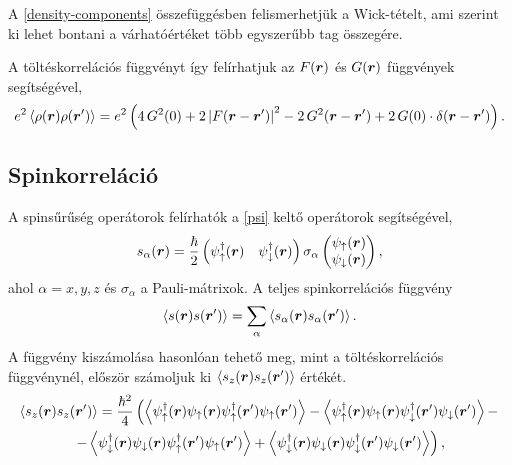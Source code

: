 \documentclass[a4paper,12pt,titlepage]{article}
\newcommand{\RR}{{\vb*{r}}}
\begin{document}
A \eqref{density-components} összefüggésben felismerhetjük a Wick-tételt, ami szerint ki lehet bontani a várhatóértéket több egyszerűbb tag összegére.

A töltéskorrelációs függvényt így felírhatjuk az $F(\RR)$ és $G(\RR)$ függvények segítségével,
\begin{equation}
	e^2 \left< \rho(\RR) \rho(\RR^\prime) \right> = e^2 \left( 4 \, G^2(0) + 2 \left| F(\RR - \RR^\prime) \right|^2 - 2 \, G^2(\RR - \RR^\prime) + 2 \, G(0) \cdot \delta(\RR - \RR^\prime) \right).
\end{equation}


\subsection{Spinkorreláció}

A spinsűrűség operátorok felírhatók a \eqref{psi} keltő operátorok segítségével,
\begin{equation}
	s_\alpha(\RR) = \frac{\hbar}{2} \begin{pmatrix} \psi_\uparrow^\dagger(\RR) & \psi_\downarrow^\dagger(\RR) \end{pmatrix} \sigma_\alpha \begin{pmatrix} \psi_\uparrow(\RR) \\ \psi_\downarrow(\RR) \end{pmatrix},
\end{equation}
ahol $\alpha = x, y, z$ és $\sigma_\alpha$ a Pauli-mátrixok.  A teljes spinkorrelációs függvény
\begin{equation}
	\left< s(\RR) s(\RR^\prime) \right> = \sum_\alpha \left< s_\alpha(\RR) s_\alpha(\RR^\prime) \right>.
\end{equation}
A függvény kiszámolása hasonlóan tehető meg, mint a töltéskorrelációs függvénynél, először számoljuk ki $\left< s_z(\RR) s_z(\RR^\prime) \right>$ értékét.
\begin{multline}
	\left< s_z(\RR) s_z(\RR^\prime) \right> = \frac{\hbar^2}{4} \left( \left< \psi_\uparrow^\dagger(\RR) \psi_\uparrow(\RR) \psi_\uparrow^\dagger(\RR^\prime) \psi_\uparrow(\RR^\prime) \right> - \left< \psi_\uparrow^\dagger(\RR) \psi_\uparrow(\RR) \psi_\downarrow^\dagger(\RR^\prime) \psi_\downarrow(\RR^\prime) \right> -
	\right. \\ \left. -
	\left< \psi_\downarrow^\dagger(\RR) \psi_\downarrow(\RR) \psi_\uparrow^\dagger(\RR^\prime) \psi_\uparrow(\RR^\prime) \right> + \left< \psi_\downarrow^\dagger(\RR) \psi_\downarrow(\RR) \psi_\downarrow^\dagger(\RR^\prime) \psi_\downarrow(\RR^\prime) \right> \right),
\end{multline}
\end{document}
